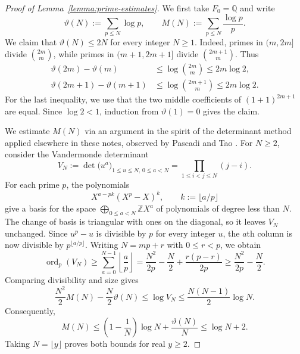 \documentclass[reqno]{amsart} 
\begin{document}
\begin{proof}[Proof of Lemma~\ref{lemma:prime-estimates}]
  We first take $F_0=\mathbb{Q}$ and write
  \begin{equation*}
    \vartheta(N):=\sum_{p\leq N}\log p,
    \qquad M(N):=\sum_{p\leq N}\frac{\log p}{p}.
  \end{equation*}
  We claim that $\vartheta(N)\leq2N$ for every integer $N\geq1$.  Indeed, primes in $(m,2m]$ divide $\binom{2m}{m}$, while primes in $(m+1,2m+1]$ divide $\binom{2m+1}{m}$.  Thus
  \begin{equation*}
    \begin{split}
      \vartheta(2m)-\vartheta(m)
      &\leq\log\binom{2m}{m}\leq2m\log2,\\
      \vartheta(2m+1)-\vartheta(m+1)
      &\leq\log\binom{2m+1}{m}\leq2m\log2.
    \end{split}
  \end{equation*}
  For the last inequality, we use that the two middle coefficients of $(1+1)^{2m+1}$ are equal.  Since $\log2<1$, induction from $\vartheta(1)=0$ gives the claim.

  We estimate $M(N)$ via an argument in the spirit of the determinant method applied elsewhere in these notes, observed by Pascadi \cite{Pascadi2026PrivateCommunication} and Tao \cite{Tao2026SiegelZeros}.  For $N\geq2$, consider the Vandermonde determinant
  \begin{equation*}
    V_N:=\det\bigl(u^a\bigr)_{1\leq u\leq N,\,0\leq a<N}
    =\prod_{1\leq i<j\leq N}(j-i).
  \end{equation*}
  For each prime $p$, the polynomials
  \begin{equation*}
    X^{a-pk}(X^p-X)^k,\qquad k:=\lfloor a/p\rfloor
  \end{equation*}
  give a basis for the space $\bigoplus_{0 \leq a < N} \mathbb{Z} X^a$ of polynomials of degree less than $N$.  The change of basis is triangular with ones on the diagonal, so it leaves $V_N$ unchanged.  Since $u^p-u$ is divisible by $p$ for every integer $u$, the $a$th column is now divisible by $p^{\lfloor a/p\rfloor}$.  Writing $N=mp+r$ with $0\leq r<p$, we obtain
  \begin{equation*}
    \operatorname{ord}_p(V_N)
    \geq\sum_{a=0}^{N-1}\left\lfloor\frac ap\right\rfloor
    =\frac{N^2}{2p}-\frac N2+\frac{r(p-r)}{2p}
    \geq\frac{N^2}{2p}-\frac N2.
  \end{equation*}
  Comparing divisibility and size gives
  \begin{equation*}
    \frac{N^2}{2}M(N)-\frac N2\vartheta(N)
    \leq\log V_N\leq\frac{N(N-1)}2\log N.
  \end{equation*}
  Consequently,
  \begin{equation*}
    M(N)\leq\left(1-\frac1N\right)\log N+\frac{\vartheta(N)}N
    \leq\log N+2.
  \end{equation*}
  Taking $N=\lfloor y\rfloor$ proves both bounds for real $y\geq2$.


\end{proof}
\end{document}
